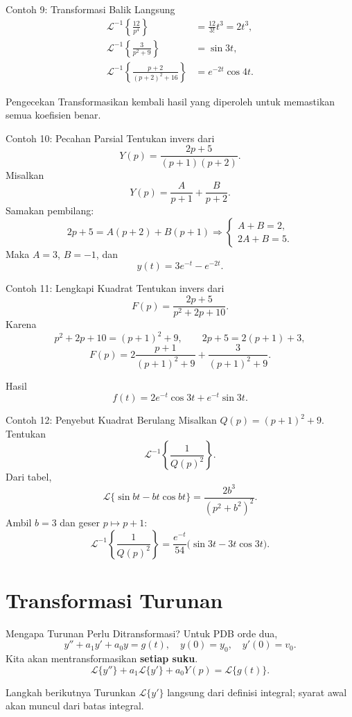 \documentclass[aspectratio=169,11pt]{beamer}
\newcommand{\Lap}{\mathcal{L}}
\newcommand{\invLap}{\mathcal{L}^{-1}}
\begin{document}
\begin{frame}{Contoh 9: Transformasi Balik Langsung}
\[
\begin{aligned}
\invLap\left\{\frac{12}{p^4}\right\}
&=\frac{12}{3!}t^3=2t^3,\\[2mm]
\invLap\left\{\frac3{p^2+9}\right\}
&=\sin3t,\\[2mm]
\invLap\left\{\frac{p+2}{(p+2)^2+16}\right\}
&=e^{-2t}\cos4t.
\end{aligned}
\]
\begin{alertblock}{Pengecekan}
Transformasikan kembali hasil yang diperoleh untuk memastikan semua koefisien benar.
\end{alertblock}
\end{frame}

\begin{frame}{Contoh 10: Pecahan Parsial}
Tentukan invers dari
\[
Y(p)=\frac{2p+5}{(p+1)(p+2)}.
\]
Misalkan
\[
Y(p)=\frac{A}{p+1}+\frac{B}{p+2}.
\]
Samakan pembilang:
\[
2p+5=A(p+2)+B(p+1)
\Rightarrow\begin{cases}A+B=2,\\2A+B=5.\end{cases}
\]
Maka $A=3$, $B=-1$, dan
\[
\boxed{y(t)=3e^{-t}-e^{-2t}}.
\]
\end{frame}

\begin{frame}{Contoh 11: Lengkapi Kuadrat}
Tentukan invers dari
\[
F(p)=\frac{2p+5}{p^2+2p+10}.
\]
Karena
\[
p^2+2p+10=(p+1)^2+9,
\qquad 2p+5=2(p+1)+3,
\]
\[
F(p)=2\frac{p+1}{(p+1)^2+9}
+\frac{3}{(p+1)^2+9}.
\]
\begin{exampleblock}{Hasil}
\[
\boxed{f(t)=2e^{-t}\cos3t+e^{-t}\sin3t}. 
\]
\end{exampleblock}
\end{frame}

\begin{frame}{Contoh 12: Penyebut Kuadrat Berulang}
Misalkan $Q(p)=(p+1)^2+9$. Tentukan
\[
\invLap\left\{\frac1{Q(p)^2}\right\}.
\]
Dari tabel,
\[
\Lap\{\sin bt-bt\cos bt\}
=\frac{2b^3}{(p^2+b^2)^2}.
\]
Ambil $b=3$ dan geser $p\mapsto p+1$:
\[
\boxed{\invLap\left\{\frac1{Q(p)^2}\right\}
=\frac{e^{-t}}{54}\bigl(\sin3t-3t\cos3t\bigr).}
\]
\end{frame}

\section{Transformasi Turunan}
\begin{frame}{Mengapa Turunan Perlu Ditransformasi?}
Untuk PDB orde dua,
\[
y''+a_1y'+a_0y=g(t),\quad y(0)=y_0,\quad y'(0)=v_0.
\]
Kita akan mentransformasikan \textbf{setiap suku}.
\[
\Lap\{y''\}+a_1\Lap\{y'\}+a_0Y(p)=\Lap\{g(t)\}.
\]
\begin{block}{Langkah berikutnya}
Turunkan $\Lap\{y'\}$ langsung dari definisi integral; syarat awal akan muncul dari batas integral.
\end{block}
\end{frame}
\end{document}
